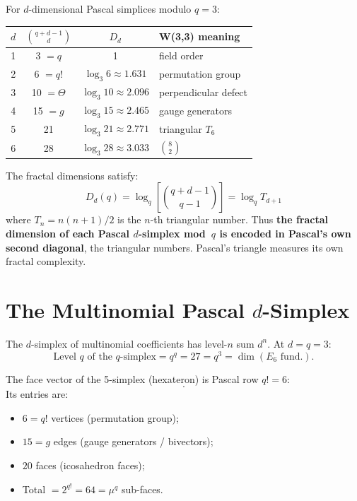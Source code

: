 \begin{theorem}[Fractal Dimension Sequence at $q=3$]
\label{thm:fractal-sequence}
For $d$-dimensional Pascal simplices modulo $q=3$:
\begin{center}
\begin{tabular}{@{}cccl@{}}
\toprule
$d$ & $\binom{q+d-1}{d}$ & $D_d$ & W(3,3) meaning \\
\midrule
1 & 3 $= q$ & 1 & field order \\
2 & 6 $= q!$ & $\log_3 6 \approx 1.631$ & permutation group \\
3 & 10 $= \Theta$ & $\log_3 10 \approx 2.096$ & perpendicular defect \\
4 & 15 $= g$ & $\log_3 15 \approx 2.465$ & gauge generators \\
5 & 21 & $\log_3 21 \approx 2.771$ & triangular $T_6$ \\
6 & 28 & $\log_3 28 \approx 3.033$ & $\binom{8}{2}$ \\
\bottomrule
\end{tabular}
\end{center}
\end{theorem}

\begin{theorem}
\label{thm:pascal-self-ref}
The fractal dimensions satisfy:
\begin{equation}
\boxed{
D_d(q) = \log_q\left[\binom{q+d-1}{q-1}\right] = \log_q T_{d+1}
}
\end{equation}
where $T_n = n(n+1)/2$ is the $n$-th triangular number.
Thus \textbf{the fractal dimension of each Pascal $d$-simplex mod~$q$
is encoded in Pascal's own second diagonal}, the triangular numbers.
Pascal's triangle measures its own fractal complexity.
\end{theorem}


\section{The Multinomial Pascal $d$-Simplex}
\label{sec:multinomial}

The $d$-simplex of multinomial coefficients has level-$n$ sum $d^n$.
At $d=q=3$:
\begin{equation}
\text{Level } q \text{ of the } q\text{-simplex} = q^q = 27 = q^3 = \dim(E_6\text{ fund.}).
\end{equation}

\begin{theorem}[The $d=q!{-}1=5$ Simplex Encodes the Standard Model]
The face vector of the 5-simplex (hexateron) is Pascal row $q!=6$:
\begin{equation}
[1,\; 6,\; 15,\; 20,\; 15,\; 6,\; 1].
\end{equation}
Its entries are:
\begin{itemize}[nosep]
\item $6 = q!$ vertices (permutation group);
\item $15 = g$ edges (gauge generators / bivectors);
\item $20$ faces (icosahedron faces);
\item Total $= 2^{q!} = 64 = \mu^q$ sub-faces.
\end{itemize}
\end{theorem}


